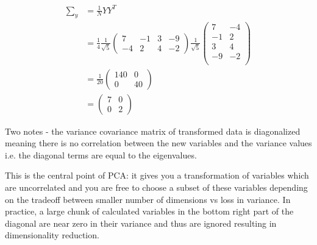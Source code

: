 \documentclass[11pt, a4paper]{article}
\begin{document}
\begin{align*}
	\sum_y &= \frac{1}{N} YY^T \\
	  & = \frac{1}{4} \frac{1}{\sqrt{5}} \begin{pmatrix} 7 & -1 & 3 & -9 \\
	-4 & 2 & 4 & -2  
	\end{pmatrix} \frac{1}{\sqrt{5}}  \begin{pmatrix} 7 & -4 \\
	-1 & 2 \\
	3 & 4 \\
	-9 & -2 \\   
	\end{pmatrix} \\
	&=  \frac{1}{20} \begin{pmatrix} 140 & 0 \\
	0 & 40 
	\end{pmatrix} \\
	&= \begin{pmatrix} 7 & 0 \\
	0 & 2 
	\end{pmatrix}          
\end{align*}

Two notes - the variance covariance matrix of transformed data is diagonalized meaning there is no correlation between the new variables and the variance values i.e. the diagonal terms are equal to the eigenvalues. 

This is the central point of PCA: it gives you a transformation of variables which are uncorrelated and you are free to choose a subset of these variables depending on the tradeoff between smaller number of dimensions vs loss in variance. In practice, a large chunk of calculated variables in the bottom right part of the diagonal are near zero in their variance and thus are ignored resulting in dimensionality reduction.
\end{document}
